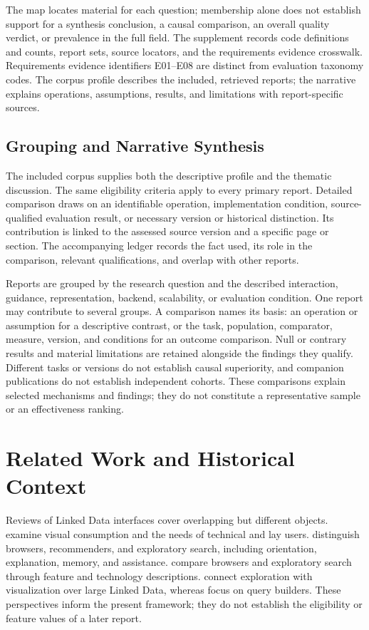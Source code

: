 \documentclass[manuscript,review,screen]{acmart}
\begin{document}
The map locates material for each question; membership alone does not establish support for a synthesis conclusion, a causal comparison, an overall quality verdict, or prevalence in the full field. The supplement records code definitions and counts, report sets, source locators, and the requirements evidence crosswalk. Requirements evidence identifiers E01--E08 are distinct from evaluation taxonomy codes. The corpus profile describes the included, retrieved reports; the narrative explains operations, assumptions, results, and limitations with report-specific sources.

\subsection{Grouping and Narrative Synthesis}
The included corpus supplies both the descriptive profile and the thematic discussion. The same eligibility criteria apply to every primary report. Detailed comparison draws on an identifiable operation, implementation condition, source-qualified evaluation result, or necessary version or historical distinction. Its contribution is linked to the assessed source version and a specific page or section. The accompanying ledger records the fact used, its role in the comparison, relevant qualifications, and overlap with other reports.

Reports are grouped by the research question and the described interaction, guidance, representation, backend, scalability, or evaluation condition. One report may contribute to several groups. A comparison names its basis: an operation or assumption for a descriptive contrast, or the task, population, comparator, measure, version, and conditions for an outcome comparison. Null or contrary results and material limitations are retained alongside the findings they qualify. Different tasks or versions do not establish causal superiority, and companion publications do not establish independent cohorts. These comparisons explain selected mechanisms and findings; they do not constitute a representative sample or an effectiveness ranking.

\section{Related Work and Historical Context}
Reviews of Linked Data interfaces cover overlapping but different objects. \citet{2011_Dadzie_Approaches_to} examine visual consumption and the needs of technical and lay users. \citet{2014_Marie_Survey_of} distinguish browsers, recommenders, and exploratory search, including orientation, explanation, memory, and assistance. \citet{2016_Jacksi_State_of} compare browsers and exploratory search through feature and technology descriptions. \citet{2016_Bikakis_Exploration_and} connect exploration with visualization over large Linked Data, whereas \citet{2016_Grafkin_SPARQL_Query} focus on query builders. These perspectives inform the present framework; they do not establish the eligibility or feature values of a later report.
\end{document}
